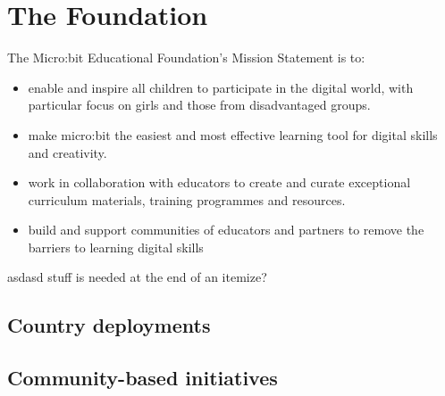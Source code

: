 \section{The Foundation}
\label{sec:mef}

The Micro:bit Educational Foundation's Mission Statement is to:
\begin{itemize}
\item  enable and inspire all children to participate in the digital world,
with particular focus on girls and those from disadvantaged groups.
\item make micro:bit the easiest and most effective learning tool for digital skills and creativity.
\item work in collaboration with educators to create and curate exceptional
curriculum materials, training programmes and resources.
\item build and support communities of educators and partners
to remove the barriers to learning digital skills
\end{itemize}

asdasd stuff is needed at the end of an itemize?

%



\subsection{Country deployments}


\subsection{Community-based initiatives}




